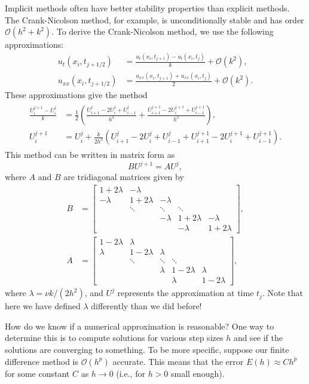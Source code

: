 Implicit methods often have better stability properties than explicit methods.
The Crank-Nicolson method, for example, is unconditionally stable and has order $\mathcal{O}(h^2 + k^2)$.
To derive the Crank-Nicolson method, we use the following approximations:
\begin{align*}
	u_t(x_i,t_{j+1/2}) &= \frac{u_t(x_i,t_{j+1}) - u_t(x_i,t_j)}{k} + \mathcal{O}(k^2), \\
	u_{xx}(x_i,t_{j+1/2}) &= \frac{u_{xx}(x_i,t_{j+1}) + u_{xx}(x_i,t_j)}{2} + \mathcal{O}(k^2).
\end{align*}
These approximations give the method
\begin{align}
	\begin{split}
	\frac{U^{j+1}_i - U^j_i}{k} &= \frac{1}{2}\left( \frac{U^j_{i+1} - 2U^j_{i} + U^j_{i-1}}{h^2} + \frac{U^{j+1}_{i+1} - 2U^{j+1}_{i} + U^{j+1}_{i-1}}{h^2}  \right) ,\\
	U^{j+1}_i  &= U^j_i + \frac{k}{2h^2} \left( U^j_{i+1} - 2U^j_{i} + U^j_{i-1} + U^{j+1}_{i+1} - 2U^{j+1}_{i} + U^{j+1}_{i-1}   \right).
\end{split}
\end{align}
This method can be written in matrix form as 
\[BU^{j+1} = A U^j,\]
where $A$ and $B$ are tridiagonal matrices given by 
\begin{align*}
B &= \left[\begin{array}{cccccc}1+2\lambda & -\lambda &  &  &  \\ -\lambda & 1+2\lambda &  -\lambda & &  \\ &  \ddots &   \ddots & \ddots \\ & &  -\lambda &  1+2\lambda & -\lambda \\ &  &  & -\lambda & 1+2\lambda\end{array}\right], \\
A &= \left[\begin{array}{cccccc}1-2\lambda & \lambda &  &  &  \\ \lambda & 1-2\lambda &  \lambda & &  \\ &  \ddots &   \ddots & \ddots \\ & &  \lambda &  1-2\lambda & \lambda \\ &  &  & \lambda & 1-2\lambda\end{array}\right], 
\end{align*}
where $\lambda = \nu k/(2h^2)$, and $U^j$ represents the approximation at time $t_j$.
Note that here we have defined $\lambda$ differently than we did before!

How do we know if a numerical approximation is reasonable?
One way to determine this is to compute solutions for various step sizes $h$ and see if the solutions are converging to something.
To be more specific, suppose our finite difference method is $\mathcal{O}(h^p)$ accurate.
This means that the error $E(h) \approx Ch^p$ for some constant $C$ as $h \to 0$ (i.e., for $h>0$ small enough).

